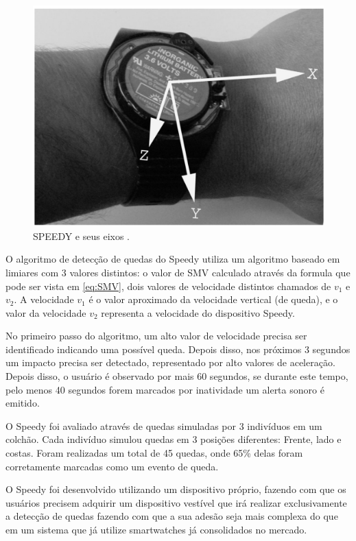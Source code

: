 \begin{figure}[ht]
	\centering
	\includegraphics[scale=0.5]{imagens/speedy.png}
	\caption{ SPEEDY e seus eixos \citep{degen2003speedy}.}
	\label{fig:speedy}
\end{figure} 

O algoritmo de detecção de quedas do Speedy utiliza um algoritmo baseado em limiares com 3 valores distintos: o valor de \ac{SMV} calculado através da formula que pode ser vista em \ref{eq:SMV}, dois valores de velocidade distintos chamados de $v_1$ e $v_2$. A velocidade $v_1$ é o valor aproximado da velocidade vertical (de queda), e o valor da velocidade $v_2$ representa a velocidade do dispositivo Speedy. 

No primeiro passo do algoritmo, um alto valor de velocidade precisa ser identificado indicando uma possível queda. Depois disso, nos próximos 3 segundos um impacto precisa ser detectado, representado por alto valores de aceleração. Depois disso, o usuário é observado por mais 60 segundos, se durante este tempo, pelo menos 40 segundos forem marcados por inatividade um alerta sonoro é emitido. 

O Speedy foi avaliado através de quedas simuladas por 3 indivíduos em um colchão. Cada indivíduo simulou  quedas em 3 posições diferentes: Frente, lado e costas. Foram realizadas um total de 45 quedas, onde 65\% delas foram corretamente marcadas como um evento de queda. 

O Speedy foi desenvolvido utilizando um dispositivo próprio, fazendo com que os usuários precisem adquirir um dispositivo vestível que irá realizar exclusivamente a detecção de quedas fazendo com que a sua adesão seja mais complexa do que em um sistema que já utilize smartwatches já consolidados no mercado.


